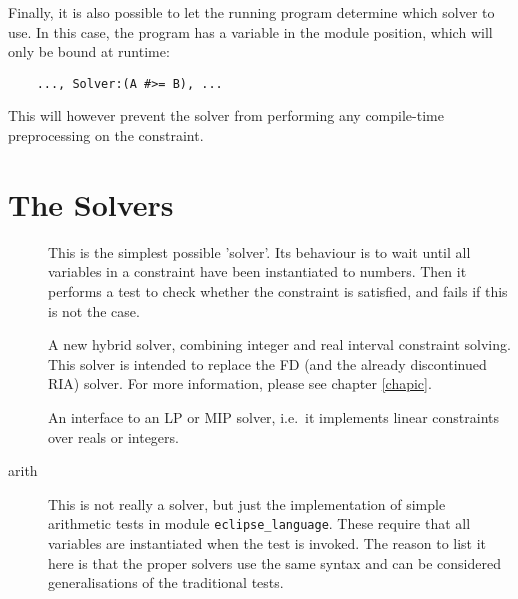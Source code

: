 Finally, it is also possible to let the running program determine which
solver to use. In this case, the program has a variable in the module
position, which will only be bound at runtime:
\begin{verbatim}
    ..., Solver:(A #>= B), ...
\end{verbatim}
This will however prevent the solver from performing any compile-time
preprocessing on the constraint.



\section{The Solvers}

\begin{description}
\item[]
    This is the simplest possible 'solver'. Its behaviour is to wait until
    all variables in a constraint have been instantiated to numbers.
    Then it performs a test to check whether the constraint is satisfied,
    and fails if this is not the case.

\item[]
    A new hybrid solver, combining integer and real interval constraint
    solving.  This solver is intended to replace the FD (and the already
    discontinued RIA) solver.
    For more information, please see chapter \ref{chapic}.

\item[]
    An interface to an LP or MIP solver, i.e.\ it implements linear
    constraints over reals or integers.


\item[arith]
    This is not really a solver, but just the implementation of simple
    arithmetic tests in module {\tt eclipse_language}. These require
    that all variables are instantiated when the test is invoked.
    The reason to list it here is that the proper solvers use the
    same syntax and can be considered generalisations of the
    traditional tests.
\end{description}

